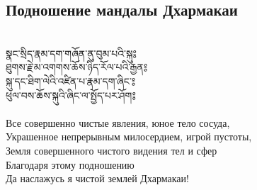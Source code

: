 \newpage
\subsection{Подношение мандалы Дхармакаи}
\\
\ti
སྣང་སྲིད་རྣམ་དག་གཞོན་ནུ་བུམ་པའི་སྐུ༔ \\
ཐུགས་རྗེ་མ་འགགས་ཆོས་ཉིད་རོལ་པའི་རྒྱན༔\\
སྐུ་དང་ཐིག་ལེའི་འཛིན་པ་རྣམ་དག་ཞིང་༔\\
ཕུལ་བས་ཆོས་སྐུའི་ཞིང་ལ་སྤྱོད་པར་ཤོག༔\\
\\
\ru
Все совершенно чистые явления, юное тело сосуда,\\
Украшенное непрерывным милосердием, игрой пустоты,\\
Земля совершенного чистого видения тел и сфер\\
Благодаря этому подношению\\
Да наслажусь я чистой землей Дхармакаи!\\

